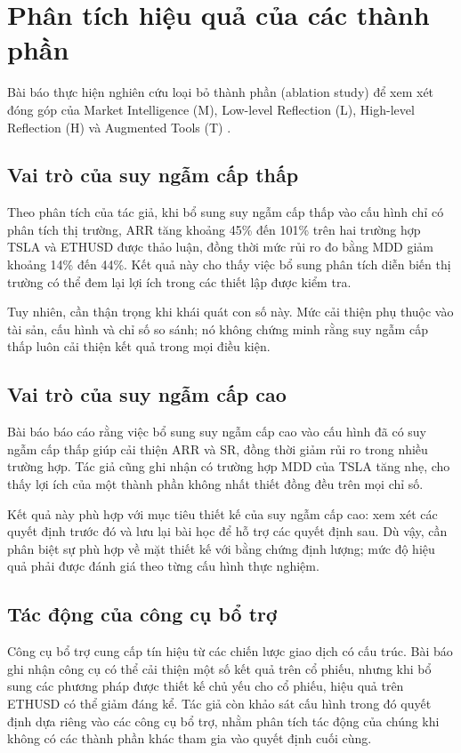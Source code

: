\section{Phân tích hiệu quả của các thành phần}

Bài báo thực hiện nghiên cứu loại bỏ thành phần (ablation study) để xem xét đóng góp của Market Intelligence (M), Low-level Reflection (L), High-level Reflection (H) và Augmented Tools (T) \cite{zhang2024finagent}.

\subsection{Vai trò của suy ngẫm cấp thấp}
Theo phân tích của tác giả, khi bổ sung suy ngẫm cấp thấp vào cấu hình chỉ có phân tích thị trường, ARR tăng khoảng 45\% đến 101\% trên hai trường hợp TSLA và ETHUSD được thảo luận, đồng thời mức rủi ro đo bằng MDD giảm khoảng 14\% đến 44\%. Kết quả này cho thấy việc bổ sung phân tích diễn biến thị trường có thể đem lại lợi ích trong các thiết lập được kiểm tra.

Tuy nhiên, cần thận trọng khi khái quát con số này. Mức cải thiện phụ thuộc vào tài sản, cấu hình và chỉ số so sánh; nó không chứng minh rằng suy ngẫm cấp thấp luôn cải thiện kết quả trong mọi điều kiện.

\subsection{Vai trò của suy ngẫm cấp cao}
Bài báo báo cáo rằng việc bổ sung suy ngẫm cấp cao vào cấu hình đã có suy ngẫm cấp thấp giúp cải thiện ARR và SR, đồng thời giảm rủi ro trong nhiều trường hợp. Tác giả cũng ghi nhận có trường hợp MDD của TSLA tăng nhẹ, cho thấy lợi ích của một thành phần không nhất thiết đồng đều trên mọi chỉ số.

Kết quả này phù hợp với mục tiêu thiết kế của suy ngẫm cấp cao: xem xét các quyết định trước đó và lưu lại bài học để hỗ trợ các quyết định sau. Dù vậy, cần phân biệt sự phù hợp về mặt thiết kế với bằng chứng định lượng; mức độ hiệu quả phải được đánh giá theo từng cấu hình thực nghiệm.

\subsection{Tác động của công cụ bổ trợ}
Công cụ bổ trợ cung cấp tín hiệu từ các chiến lược giao dịch có cấu trúc. Bài báo ghi nhận công cụ có thể cải thiện một số kết quả trên cổ phiếu, nhưng khi bổ sung các phương pháp được thiết kế chủ yếu cho cổ phiếu, hiệu quả trên ETHUSD có thể giảm đáng kể. Tác giả còn khảo sát cấu hình trong đó quyết định dựa riêng vào các công cụ bổ trợ, nhằm phân tích tác động của chúng khi không có các thành phần khác tham gia vào quyết định cuối cùng.

